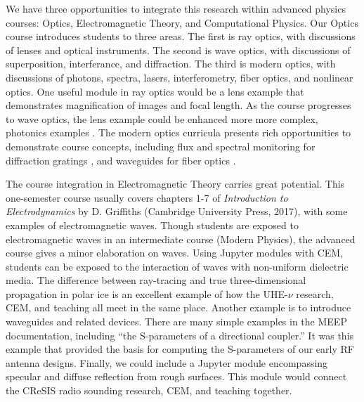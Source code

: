 \documentclass[../../main.tex]{subfiles}
\begin{document}
We have three opportunities to integrate this research within advanced physics courses: Optics, Electromagnetic Theory, and Computational Physics.  Our Optics course introduces students to three areas.  The first is ray optics, with discussions of lenses and optical instruments.  The second is wave optics, with discussions of superposition, interferance, and diffraction. The third is modern optics, with discussions of photons, spectra, lasers, interferometry, fiber optics, and nonlinear optics.  One useful module in ray optics would be a lens example that demonstrates magnification of images and focal length.  As the course progresses to wave optics, the lens example could be enhanced more more complex, photonics examples \cite{meepcon2022_3}.  The modern optics curricula presents rich opportunities to demonstrate course concepts, including flux and spectral monitoring for diffraction gratings \cite{meepcon2022_4}, and waveguides for fiber optics \cite{meepcon2022_5}.  \\ \vspace{2.5mm}

The course integration in Electromagnetic Theory carries great potential.  This one-semester course usually covers chapters 1-7 of \textit{Introduction to Electrodynamics} by D. Griffiths (Cambridge University Press, 2017), with some examples of electromagnetic waves.  Though students are exposed to electromagnetic waves in an intermediate course (Modern Physics), the advanced course gives a minor elaboration on waves.  Using Jupyter modules with CEM, students can be exposed to the interaction of waves with non-uniform dielectric media.  The difference between ray-tracing and true three-dimensional propagation in polar ice is an excellent example of how the UHE-$\nu$ research, CEM, and teaching all meet in the same place.  Another example is to introduce waveguides and related devices.  There are many simple examples in the MEEP documentation, including ``the S-parameters of a directional coupler.''  It was this example that provided the basis for computing the S-parameters of our early RF antenna designs.  Finally, we could include a Jupyter module encompassing specular and diffuse reflection from rough surfaces.  This module would connect the CReSIS radio sounding research, CEM, and teaching together. \\ \vspace{2.5mm}
\end{document}
